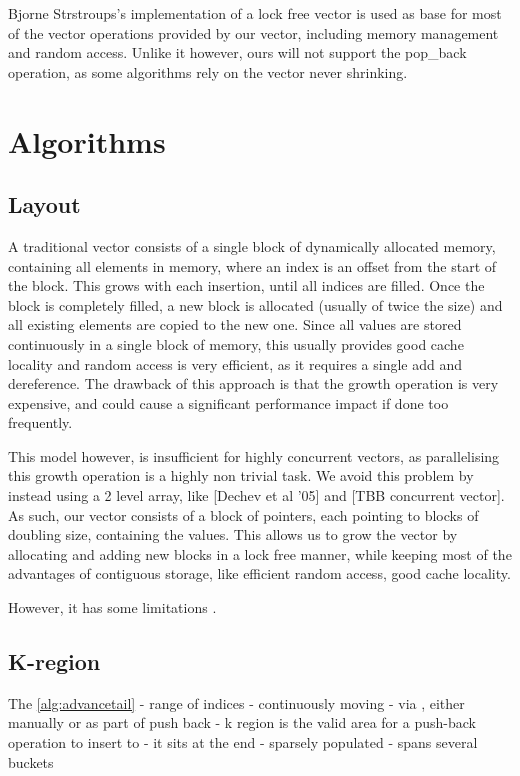 \documentclass{sigplanconf}
\begin{document}
Bjorne Strstroups's implementation of a lock free vector is used as
base for most of the vector operations provided by our vector, including
memory management and random access. Unlike it however, ours will
not support the pop\_back operation, as some algorithms rely on the
vector never shrinking.


\section{Algorithms}

\subsection{Layout}
A traditional vector consists of a single block of dynamically allocated memory, containing all elements in memory, where an index is an offset from the start of the block. This grows with each insertion, until all indices are filled. Once the block is completely filled, a new block is allocated (usually of twice the size) and all existing elements are copied to the new one. Since all values are stored continuously in a single block of memory, this usually provides good cache locality and random access is very efficient, as it requires a single add and dereference. The drawback of this approach is that the growth operation is very expensive, and could cause a significant performance impact if done too frequently.

This model however, is insufficient for highly concurrent vectors, as parallelising this growth operation is a highly non trivial task. We avoid this problem by instead using a 2 level array, like [Dechev et al '05] and [TBB concurrent vector]. As such, our vector consists of a block of pointers, each pointing to blocks of doubling size, containing the values. This allows us to grow the vector by allocating and adding new blocks in a lock free manner, while keeping most of the advantages of contiguous storage, like efficient random access, good cache locality.

However, it has some limitations \cite{dechev06}.

\subsection{K-region}
The \ref{alg:advancetail}
- range of indices
- continuously moving
  - via , either manually or as part of push back
- k region is the valid area for a push-back operation to insert to
- it sits at the end
- sparsely populated
- spans several buckets
\end{document}

